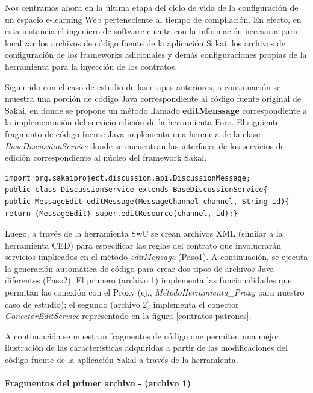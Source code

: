 Nos centramos ahora en la última etapa del ciclo de vida de la configuración de
un espacio e-learning Web perteneciente al tiempo de compilación. En efecto, en
esta instancia el ingeniero de software cuenta con la información necesaria para
localizar los archivos de código fuente de la aplicación Sakai, los archivos de
configuración de los frameworks adicionales y demás configuraciones propias de
la herramienta para la inyección de los contratos.

Siguiendo  con el caso de estudio de las etapas anteriores, a continuación  se
muestra una porción de código Java correspondiente al código fuente original de
Sakai, en  donde se propone un método llamado \textbf{editMenssage}
correspondiente a la implementación del servicio edición de la herramienta Foro.
El siguiente fragmento de código fuente Java implementa una herencia de la clase
\textit{BaseDiscussionService} donde se encuentran las interfaces de los
servicios de edición correspondiente al núcleo del framework Sakai. 

\small \begin{verbatim}
import org.sakaiproject.discussion.api.DiscussionMessage; 
public class DiscussionService extends BaseDiscussionService{
public MessageEdit editMessage(MessageChannel channel, String id)‏{
return (MessageEdit) super.editResource(channel, id);}
\end{verbatim} \normalsize

Luego, a través de la herramienta SwC se crean archivos XML (similar a la
herramienta CED) para especificar las reglas del contrato que involucrarán
servicios implicados en el método \textit{editMensage} (Paso1). A continuación,
se ejecuta la generación automática de código para crear dos tipos de archivos
Java diferentes (Paso2). El primero (archivo 1) implementa las funcionalidades
que permitan las conexión con el Proxy (ej., \textit{MétodoHerramienta\_Proxy}
para nuestro caso de estudio); el segundo (archivo 2) implementa el conector
\textit{ConectorEditService} representado en la figura
\ref{contratos-patrones}. 

A continuación se muestran fragmentos de código que permiten una mejor
ilustración de las características adquiridas a partir de las modificaciones 
del código fuente de la aplicación Sakai a través de la herramienta.

\paragraph {Fragmentos del primer archivo - (archivo 1)}

